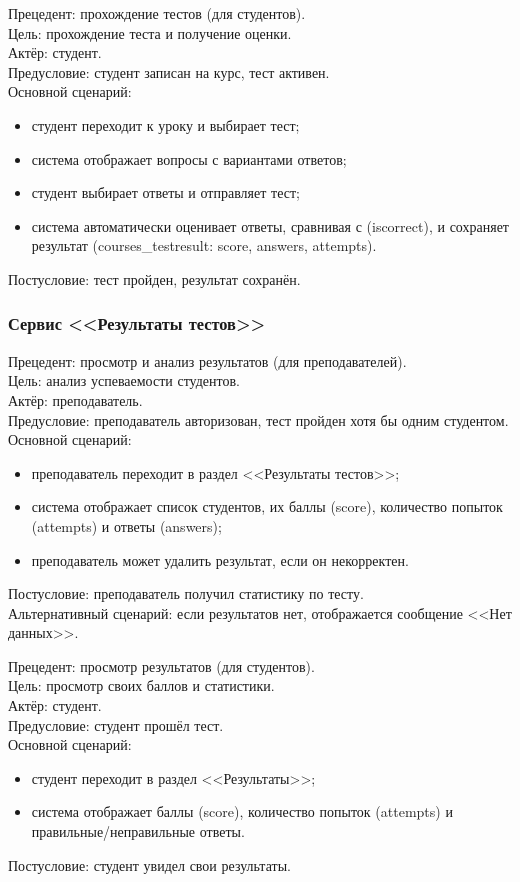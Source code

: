 	{Прецедент: прохождение тестов (для студентов)}. \\
	{Цель}: прохождение теста и получение оценки. \\
	{Актёр}: студент. \\
	{Предусловие}: студент записан на курс, тест активен. \\
	{Основной сценарий}:
	\begin{itemize}
		\item студент переходит к уроку и выбирает тест;
		\item система отображает вопросы с вариантами ответов;
		\item студент выбирает ответы и отправляет тест;
		\item система автоматически оценивает ответы, сравнивая с (iscorrect), и сохраняет результат (courses\_testresult: score, answers, attempts).
	\end{itemize}
	{Постусловие}: тест пройден, результат сохранён.
	
\subsubsection {Сервис <<Результаты тестов>>}
	
	{Прецедент: просмотр и анализ результатов (для преподавателей)}. \\
	{Цель}: анализ успеваемости студентов. \\
	{Актёр}: преподаватель. \\
	{Предусловие}: преподаватель авторизован, тест пройден хотя бы одним студентом. \\
	{Основной сценарий}:
	\begin{itemize}
		\item преподаватель переходит в раздел <<Результаты тестов>>;
		\item система отображает список студентов, их баллы (score), количество попыток (attempts) и ответы (answers);
		\item преподаватель может удалить результат, если он некорректен.
	\end{itemize}
	{Постусловие}: преподаватель получил статистику по тесту. \\
	{Альтернативный сценарий}: если результатов нет, отображается сообщение <<Нет данных>>.
	
	{Прецедент: просмотр результатов (для студентов)}. \\
	{Цель}: просмотр своих баллов и статистики. \\
	{Актёр}: студент. \\
	{Предусловие}: студент прошёл тест. \\
	{Основной сценарий}:
	\begin{itemize}
		\item студент переходит в раздел <<Результаты>>;
		\item система отображает баллы (score), количество попыток (attempts) и правильные/неправильные ответы.
	\end{itemize}
	{Постусловие}: студент увидел свои результаты.
	
